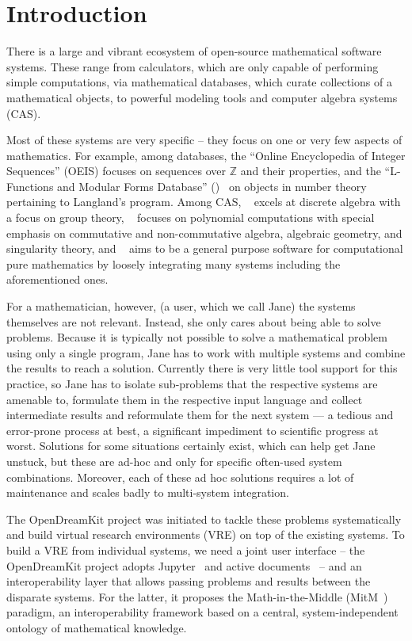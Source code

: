\section{Introduction}\label{sec:intro}

There is a large and vibrant ecosystem of open-source mathematical software systems. 
These range from calculators, which are only capable of performing simple computations, via mathematical databases, which curate collections of a mathematical objects, to powerful modeling tools and computer algebra systems (CAS).

Most of these systems are very specific -- they focus on one or very few aspects of
mathematics.  For example, among databases, the ``Online Encyclopedia of Integer Sequences'' (OEIS) focuses
on sequences over $\mathbb{Z}$ and their properties, and the ``L-Functions and Modular Forms
Database'' (\LMFDB)~\cite{Cremona:LMFDB16,lmfdb:on} on objects in number theory pertaining to
Langland's program. Among CAS, \GAP~\cite{GAP:on} excels at discrete algebra with a focus on group theory,
\Singular~\cite{singular:on} focuses on polynomial computations with special emphasis on
commutative and non-commutative algebra, algebraic geometry, and singularity theory, and
\Sage~\cite{SageMath:on} aims to be a general purpose software for computational pure
mathematics by loosely integrating many systems including the aforementioned ones.

For a mathematician, however, (a user, which we call Jane) the systems themselves are not relevant.
Instead, she only cares about being able to solve problems. 
Because it is typically not possible to solve a mathematical problem using only a single program, Jane has to work with multiple systems and combine the results to reach a solution. 
Currently there is very little tool support for this practice, so Jane has to isolate sub-problems that the respective systems are amenable to, formulate them in the respective input language and collect intermediate results and reformulate them for the next system --- a tedious and error-prone process at best, a significant impediment to scientific progress at worst.
Solutions for some situations certainly exist, which can help get Jane unstuck, but these are ad-hoc and only for specific often-used system combinations. 
Moreover, each of these ad hoc solutions requires a lot of maintenance and scales badly to multi-system integration. 

The OpenDreamKit project was initiated to tackle these problems systematically and build virtual research environments (VRE) on top of the existing systems.
To build a VRE from individual systems, we need a joint user interface -- the OpenDreamKit project adopts Jupyter~\cite{jupyter-project:on} and active
documents~\cite{KohDavGin:psewads11} -- and an interoperability layer that allows passing problems and results between the disparate systems. 
For the latter, it proposes the Math-in-the-Middle (MitM~\cite{DehKohKon:iop16}) paradigm, an interoperability framework based on a central, system-independent ontology of mathematical knowledge.

